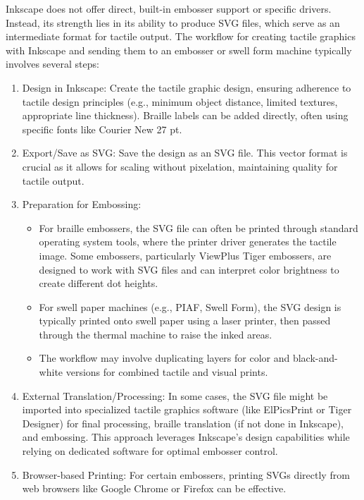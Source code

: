 Inkscape does not offer direct, built-in embosser support or specific drivers. Instead, its strength lies in its ability to produce SVG files, which serve as an intermediate format for tactile output. \cite{ProBlindCreate,NimProQuick} The workflow for creating tactile graphics with Inkscape and sending them to an embosser or swell form machine typically involves several steps:

\begin{enumerate}
    \item Design in Inkscape: Create the tactile graphic design, ensuring adherence to tactile design principles (e.g., minimum object distance, limited textures, appropriate line thickness). \cite{ProBlindCreate,DuxburyDBTDetails} Braille labels can be added directly, often using specific fonts like Courier New 27 pt. \cite{GetBraille}
    \item Export/Save as SVG: Save the design as an SVG file. \cite{ProBlindCreate} This vector format is crucial as it allows for scaling without pixelation, maintaining quality for tactile output. \cite{BlindHelpDBT}
    \item Preparation for Embossing:
    \begin{itemize}
        \item For braille embossers, the SVG file can often be printed through standard operating system tools, where the printer driver generates the tactile image. \cite{IrieTactileView} Some embossers, particularly ViewPlus Tiger embossers, are designed to work with SVG files and can interpret color brightness to create different dot heights. \cite{ProBlindCreate,DuxburyProducts,IrieBrailleTrac}
        \item For swell paper machines (e.g., PIAF, Swell Form), the SVG design is typically printed onto swell paper using a laser printer, then passed through the thermal machine to raise the inked areas. \cite{DuxburyProducts,NimProQuick}
        \item The workflow may involve duplicating layers for color and black-and-white versions for combined tactile and visual prints. \cite{NimProQuick}
    \end{itemize}
    \item External Translation/Processing: In some cases, the SVG file might be imported into specialized tactile graphics software (like ElPicsPrint or Tiger Designer) for final processing, braille translation (if not done in Inkscape), and embossing. \cite{DuxburyDBTDetails,ElitaElPicsPrint} This approach leverages Inkscape's design capabilities while relying on dedicated software for optimal embosser control.
    \item Browser-based Printing: For certain embossers, printing SVGs directly from web browsers like Google Chrome or Firefox can be effective. \cite{ProBlindCreate}
\end{enumerate}

